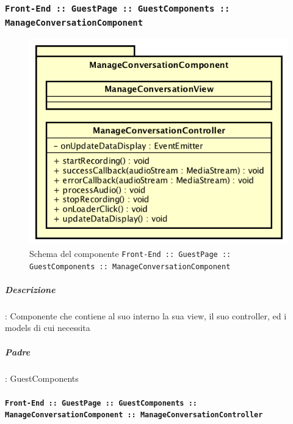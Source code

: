 \documentclass[../DefinizioneDiProdotto_v2.0.0.tex]{subfiles}
\begin{document}
	\newpage
	\subsubsection{\texttt{Front-End :: GuestPage :: GuestComponents :: ManageConversationComponent}}
	\begin{figure}[!h]
		\centering
		\includegraphics[scale=0.7]{Architettura/Front-End/GuestPage/GuestComponents/ManageConversationComponent.png}
		\caption{Schema del componente \texttt{Front-End :: GuestPage :: GuestComponents :: ManageConversationComponent}}
	\end{figure}

			\subparagraph{Descrizione}: Componente che contiene al suo interno la sua view, il suo controller, ed i models di cui necessita
			\subparagraph{Padre}: GuestComponents

			\paragraph{\texttt{Front-End :: GuestPage :: GuestComponents :: ManageConversationComponent :: ManageConversationController}}
\end{document}
